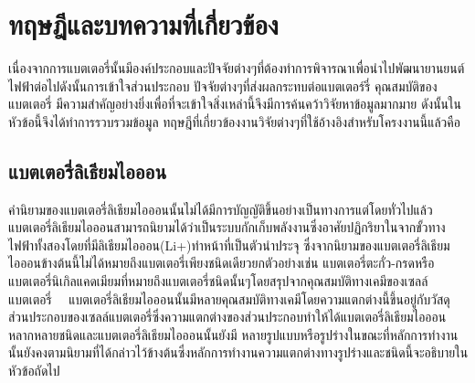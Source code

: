 \chapter{ทฤษฎีและบทความที่เกี่ยวข้อง}
เนื่องจากการแบตเตอรี่นั้นมีองค์ประกอบและปัจจัยต่างๆที่ต้องทำการพิจารณาเพื่อนำไปพัฒนายานยนต์ไฟฟ้าต่อไปดังนั้นการเข้าใจส่วนประกอบ ปัจจัยต่างๆที่ส่งผลกระทบต่อแบตเตอร์รี่ คุณสมบัติของแบตเตอรี่ มีความสำคัญอย่างยิ่งเพื่อที่จะเข้าใจสิ่งเหล่านี้จึงมีการค้นคว้าวิจัยหาข้อมูลมากมาย ดังนั้นในหัวข้อนี้จึงได้ทำการรวบรวมข้อมูล ทฤษฎีที่เกี่ยวข้องงานวิจัยต่างๆที่ใช้อ้างอิงสำหรับโครงงานนี้แล้วคือ
\section{แบตเตอรี่ลิเธียมไอออน}
คำนิยามของแบตเตอรี่ลิเธียมไอออนนั้นไม่ได้มีการบัญญัติขึ้นอย่างเป็นทางการแต่โดยทั่วไปแล้วแบตเตอรี่ลิเธียมไอออนสามารถนิยามได้ว่าเป็นระบบกักเก็บพลังงานซึ่งอาศัยปฏิกริยาในจากขั้วทางไฟฟ้าทั้งสองโดยที่มีลิเธียมไอออน(Li+)ทำหน้าที่เป็นตัวนำประจุ ซึ่งจากนิยามของแบตเตอรี่ลิเธียมไอออนข้างต้นนี้ไม่ได้หมายถึงแบตเตอรี่เพียงชนิดเดียวยกตัวอย่างเช่น แบตเตอรี่ตะกั่ว-กรดหรือแบตเตอรี่นิเกิลแคดเมียมที่หมายถึงแบตเตอรี่ชนิดนั้นๆโดยสรุปจากคุณสมบัติทางเคมีของเซลล์แบตเตอรี่
\ \ แบตเตอรี่ลิเธียมไอออนนั้นมีหลายคุณสมบัติทางเคมีโดยความแตกต่างนี้ขึ้นอยู่กับวัสดุส่วนประกอบของเซลล์แบตเตอรี่ซึ่งความแตกต่างของส่วนประกอบทำให้ได้แบตเตอรี่ลิเธียมไอออนหลากหลายชนิดและแบตเตอรี่ลิเธียมไอออนนั้นยังมี
หลายรูปแบบหรือรูปร่างในขณะที่หลักการทำงานนั้นยังคงตามนิยามที่ได้กล่าวไว้ข้างต้นซึ่งหลักการทำงานความแตกต่างทางรูปร่างและชนิดนี้จะอธิบายในหัวข้อถัดไป
